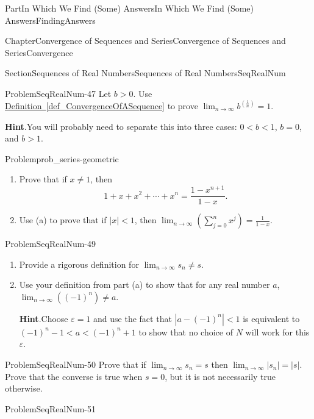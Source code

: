 \documentclass[oneside,10pt,]{book}
\newcommand{\blocktitlefont}{\relax}
\newcommand{\xreffont}{\relax}
\numberwithin{equation}{part}
\newcommand{\abs}[1]{\left|#1\right|}
\def\limit#1#2#3{{\displaystyle\lim_{#1\rightarrow #2}#3}}
\def\limitt#1#2#3{{\displaystyle\lim_{#1\rightarrow #2}\textstyle #3}}
\newcommand{\eps}{\varepsilon}
\newcommand{\lt}{<}
\newcommand{\gt}{>}
\begin{document}
\begin{partptx}{Part}{In Which We Find (Some) Answers}{}{In Which We Find (Some) Answers}{}{}{FindingAnswers}
\begin{chapterptx}{Chapter}{Convergence of Sequences and Series}{}{Convergence of Sequences and Series}{}{}{Convergence}
\begin{sectionptx}{Section}{Sequences of Real Numbers}{}{Sequences of Real Numbers}{}{}{SeqRealNum}
\begin{problem}{Problem}{}{SeqRealNum-47}%
\index{limit!\(\limit{n}{\infty}{b^{\left(\frac{1}{n}\right)}}=1\) if \(b>0\)} Let \(b>0\).  Use \hyperref[def_ConvergenceOfASequence]{Definition~{\xreffont\ref{def_ConvergenceOfASequence}}} to prove \(\limitt{n}{\infty}{b^{\left(\frac{1}{n}\right)}}=1\).%
\par\smallskip%
\noindent\textbf{\blocktitlefont Hint}.\hypertarget{SeqRealNum-47-2}{}\quad{}You will probably need to separate this into three cases: \(0\lt b\lt 1\), \(b=0\), and \(b\gt 1\).%
\end{problem}
\begin{problem}{Problem}{}{prob_series-geometric}%
\begin{enumerate}[font=\bfseries,label=(\alph*),ref=\alph*]%
\item{}Prove that if \(x\neq 1\), then%
\begin{equation*}
1+x+x^2+\cdots+x^n=\frac{1-x^{n+1}}{1-x}\text{.}
\end{equation*}
%
\item{}Use (a) to prove that if \(|x|\lt 1\), then \(\limit{n}{\infty}{\left(\sum_{j=0}^nx^j\right)}=\frac{1}{1-x}\).%
\end{enumerate}%
\end{problem}
\begin{problem}{Problem}{}{SeqRealNum-49}%
\begin{enumerate}[font=\bfseries,label=(\alph*),ref=\alph*]%
\item{}Provide a rigorous definition for \(\limitt{n}{\infty}{s_n}\neq s\).%
\item{}Use your definition from part (a) to show that for any real number \(a\), \(\limitt{n}{\infty}{\left(\left(-1\right)^n\right)}\neq a\).%
\par\smallskip%
\noindent\textbf{\blocktitlefont Hint}.\hypertarget{SeqRealNum-49-4-2}{}\quad{}Choose \(\eps=1\) and use the fact that \(\abs{a-(-1)^n}\lt 1\) is equivalent to \(\left(-1\right)^n-1\lt a\lt \left(-1\right)^n+1\) to show that no choice of \(N\) will work for this \(\eps\).%
\end{enumerate}%
\end{problem}
\begin{problem}{Problem}{}{SeqRealNum-50}%
Prove that if \(\limit{n}{\infty}{s_n}=s\) then \(\limit{n}{\infty}{\abs{s_n}}=\abs{s}\).  Prove that the converse is true when \(s=0\), but it is not necessarily true otherwise.%
\end{problem}
\begin{problem}{Problem}{}{SeqRealNum-51}%

\end{problem}
\end{sectionptx}
\end{chapterptx}
\end{partptx}
\end{document}
